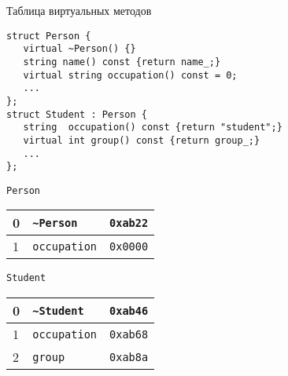 \documentclass{beamer}
\begin{document}
\begin{frame}[fragile]{Таблица виртуальных методов}
    \begin{lstlisting}
struct Person {
   virtual ~Person() {}
   string name() const {return name_;}
   virtual string occupation() const = 0;
   ...
};
struct Student : Person {
   string  occupation() const {return "student";}
   virtual int group() const {return group_;}
   ...
};
    \end{lstlisting}

\begin{minipage}{35mm}
    {\tt Person}
    \begin{tabular}{|l|l|l|}
        \hline
        0 & \texttt{\textasciitilde{}Person}   & \texttt{0xab22} \\\hline
        1 & \texttt{occupation} & \texttt{0x0000} \\\hline
    \end{tabular}\vspace{4.8mm}\mbox{}
\end{minipage}\hspace{2cm}
\begin{minipage}{3cm}
    {\tt Student}
    \begin{tabular}{|l|l|l|}
        \hline
        0 & \texttt{\textasciitilde{}Student} &  \texttt{0xab46} \\\hline
        1 & \texttt{occupation} & \texttt{0xab68} \\\hline
        2 & \texttt{group} & \texttt{0xab8a}     \\\hline
    \end{tabular}
\end{minipage}
\end{frame}
\end{document}
